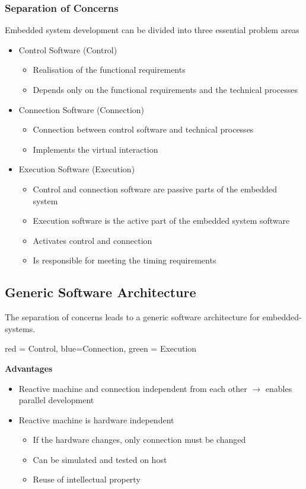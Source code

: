 \subsubsection{Separation of Concerns}
Embedded system development can be divided into three essential problem areas
\begin{itemize}
    \item Control Software (Control)
          \begin{itemize}
              \item Realisation of the functional requirements
              \item Depends only on the functional requirements and the technical processes
          \end{itemize}
    \item Connection Software (Connection)
          \begin{itemize}
              \item Connection between control software and technical processes
              \item Implements the virtual interaction
          \end{itemize}
    \item Execution Software (Execution)
          \begin{itemize}
              \item Control and connection software are passive parts of the embedded system
              \item Execution software is the active part of the embedded system software
              \item Activates control and connection
              \item Is responsible for meeting the timing requirements
          \end{itemize}
\end{itemize}

\subsection{Generic Software Architecture}
The separation of concerns leads to a generic software architecture for embedded-systems.

{\color{red}red = Control}, {\color{blue}blue=Connection}, {\color{green}green = Execution}

\textbf{Advantages}
\begin{itemize}
    \item Reactive machine and connection independent from each other $\rightarrow$ enables parallel development
    \item Reactive machine is hardware independent
          \begin{itemize}
              \item If the hardware changes, only connection must be changed
              \item Can be simulated and tested on host
              \item Reuse of intellectual property
          \end{itemize}
\end{itemize}

